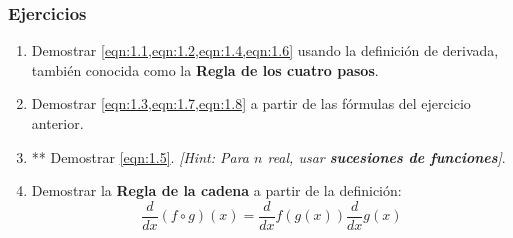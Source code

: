 \subsubsection{Ejercicios}
\begin{enumerate}
	\item Demostrar \cref{eqn:1.1,eqn:1.2,eqn:1.4,eqn:1.6} usando la definición de derivada, también conocida como la \textbf{Regla de los cuatro pasos}.
	\item Demostrar \cref{eqn:1.3,eqn:1.7,eqn:1.8} a partir de las fórmulas del ejercicio anterior.
	\item ** Demostrar \cref{eqn:1.5}. \textsl{[Hint: Para $n$ real, usar \textbf{sucesiones de funciones}]}.
	\item Demostrar la \textbf{Regla de la cadena} a partir de la definición:
	$$\frac{d}{dx}(f\circ g)(x)=\frac{d}{dx}f(g(x))\frac{d}{dx}g(x)$$
\end{enumerate}